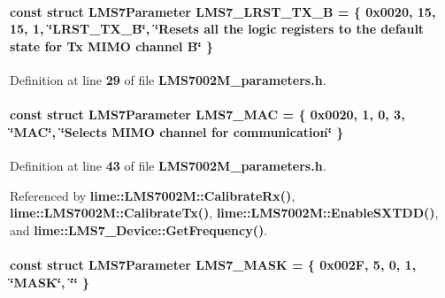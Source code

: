 \paragraph[{L\+M\+S7\+\_\+\+L\+R\+S\+T\+\_\+\+T\+X\+\_\+B}]{\setlength{\rightskip}{0pt plus 5cm}const struct {\bf L\+M\+S7\+Parameter} L\+M\+S7\+\_\+\+L\+R\+S\+T\+\_\+\+T\+X\+\_\+B = \{ 0x0020, 15, 15, 1, \char`\"{}\+L\+R\+S\+T\+\_\+\+T\+X\+\_\+\+B\char`\"{}, \char`\"{}\+Resets all the logic registers to the default state for Tx M\+I\+M\+O channel B\char`\"{} \}\hspace{0.3cm}{\ttfamily [static]}}\label{LMS7002M__parameters_8h_a610d4ccb61ee797f29c3bb0893eef25f}


Definition at line {\bf 29} of file {\bf L\+M\+S7002\+M\+\_\+parameters.\+h}.

\paragraph[{L\+M\+S7\+\_\+\+M\+AC}]{\setlength{\rightskip}{0pt plus 5cm}const struct {\bf L\+M\+S7\+Parameter} L\+M\+S7\+\_\+\+M\+AC = \{ 0x0020, 1, 0, 3, \char`\"{}\+M\+A\+C\char`\"{}, \char`\"{}\+Selects M\+I\+M\+O channel for communication\char`\"{} \}\hspace{0.3cm}{\ttfamily [static]}}\label{LMS7002M__parameters_8h_ae379e3060d4a298d2ceb0813e1228187}


Definition at line {\bf 43} of file {\bf L\+M\+S7002\+M\+\_\+parameters.\+h}.



Referenced by {\bf lime\+::\+L\+M\+S7002\+M\+::\+Calibrate\+Rx()}, {\bf lime\+::\+L\+M\+S7002\+M\+::\+Calibrate\+Tx()}, {\bf lime\+::\+L\+M\+S7002\+M\+::\+Enable\+S\+X\+T\+D\+D()}, and {\bf lime\+::\+L\+M\+S7\+\_\+\+Device\+::\+Get\+Frequency()}.

\paragraph[{L\+M\+S7\+\_\+\+M\+A\+SK}]{\setlength{\rightskip}{0pt plus 5cm}const struct {\bf L\+M\+S7\+Parameter} L\+M\+S7\+\_\+\+M\+A\+SK = \{ 0x002\+F, 5, 0, 1, \char`\"{}\+M\+A\+S\+K\char`\"{}, \char`\"{}\char`\"{} \}\hspace{0.3cm}{\ttfamily [static]}}\label{LMS7002M__parameters_8h_a3aa3a044afda19da46417d9799b32648}


